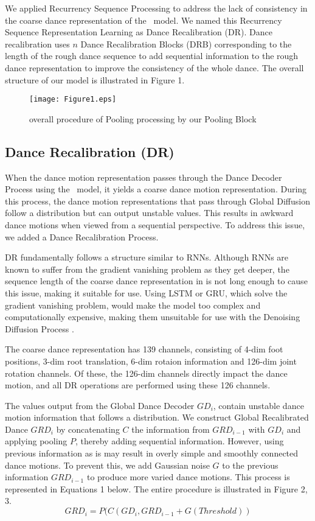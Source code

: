 We applied Recurrency Sequence Processing to address the lack of consistency in the coarse dance representation of the~\cite{li2024lodge} model. We named this Recurrency Sequence Representation Learning as Dance Recalibration (DR). Dance recalibration uses \(n\) Dance Recalibration Blocks (DRB) corresponding to the length of the rough dance sequence to add sequential information to the rough dance representation to improve the consistency of the whole dance. The overall structure of our model is illustrated in Figure 1.

\begin{figure}[!t]
    \centering
    \texttt{[image: Figure1.eps]}
    \caption{overall procedure of Pooling processing by our Pooling Block}
    \label{fig:enter-label4}
\end{figure}


\subsection{Dance Recalibration (DR)}
When the dance motion representation passes through the Dance Decoder Process using the~\cite{li2024lodge} model, it yields a coarse dance motion representation. During this process, the dance motion representations that pass through Global Diffusion follow a distribution but can output unstable values. This results in awkward dance motions when viewed from a sequential perspective. To address this issue, we added a Dance Recalibration Process.

DR fundamentally follows a structure similar to RNNs. Although RNNs are known to suffer from the gradient vanishing problem as they get deeper, the sequence length of the coarse dance representation in \cite{li2024lodge} is not long enough to cause this issue, making it suitable for use. Using LSTM or GRU, which solve the gradient vanishing problem, would make the model too complex and computationally expensive, making them unsuitable for use with the Denoising Diffusion Process \cite{ho2020denoising, song2020denoising}.

The coarse dance representation has 139 channels, consisting of 4-dim foot positions, 3-dim root translation, 6-dim rotaion information and 126-dim joint rotation channels. Of these, the 126-dim channels directly impact the dance motion, and all DR operations are performed using these 126 channels.

The values output from the Global Dance Decoder \(GD_{i}\), contain unstable dance motion information that follows a distribution. We construct Global Recalibrated Dance \(GRD_{i}\) by concatenating \(C\) the information from \(GRD_{i-1}\) with \(GD_{i}\) and applying pooling \(P\), thereby adding sequential information. However, using previous information as is may result in overly simple and smoothly connected dance motions. To prevent this, we add Gaussian noise \(G\) to the previous information \(GRD_{i-1}\) to produce more varied dance motions. This process is represented in Equations 1 below. The entire procedure is illustrated in Figure 2, 3.
\begin{equation}
    GRD_{i} = P(C(GD_{i} , GRD_{i-1} + G(Threshold))
\end{equation}



